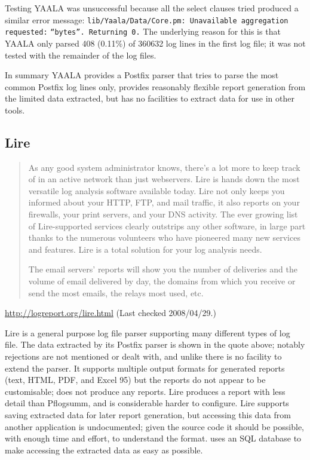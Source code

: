 Testing YAALA was unsuccessful because all the select clauses tried
produced a similar error message:
\newline{}\tab{}\texttt{lib/Yaala/Data/Core.pm: Unavailable aggregation
requested:} \newline{}\tab{}\tab{}\texttt{``bytes''. Returning 0.}
\newline{}  The underlying reason for this is that YAALA only parsed 408
(0.11\%) of 360632 log lines in the first log file; it was not tested with
the remainder of the \numberOFlogFILES{} log files.

In summary YAALA provides a Postfix parser that tries to parse the most
common Postfix log lines only, provides reasonably flexible report
generation from the limited data extracted, but has no facilities to
extract data for use in other tools.

\subsection{Lire}

\begin{quotation}

    As any good system administrator knows, there's a lot more to keep
    track of in an active network than just webservers. Lire is hands down
    the most versatile log analysis software available today. Lire not only
    keeps you informed about your HTTP, FTP, and mail traffic, it also
    reports on your firewalls, your print servers, and your DNS activity.
    The ever growing list of Lire-supported services clearly outstrips any
    other software, in large part thanks to the numerous volunteers who
    have pioneered many new services and features. Lire is a total solution
    for your log analysis needs.

    The email servers' reports will show you the number of deliveries and
    the volume of email delivered by day, the domains from which you
    receive or send the most emails, the relays most used, etc.

\end{quotation}

\noindent{}\url{http://logreport.org/lire.html} \newline{}
(Last checked 2008/04/29.)

Lire is a general purpose log file parser supporting many different types
of log file.  The data extracted by its Postfix parser is shown in the
quote above; notably rejections are not mentioned or dealt with, and unlike
\parsername{} there is no facility to extend the parser.  It supports
multiple output formats for generated reports (text, HTML, PDF, and Excel
95) but the reports do not appear to be customisable; \parsername{} does
not produce any reports.  Lire produces a report with less detail than
Pflogsumm, and is considerable harder to configure.  Lire supports saving
extracted data for later report generation, but accessing this data from
another application is undocumented; given the source code it should be
possible, with enough time and effort, to understand the format.
\parsername{} uses an \gls{SQL} database to make accessing the extracted
data as easy as possible.  

